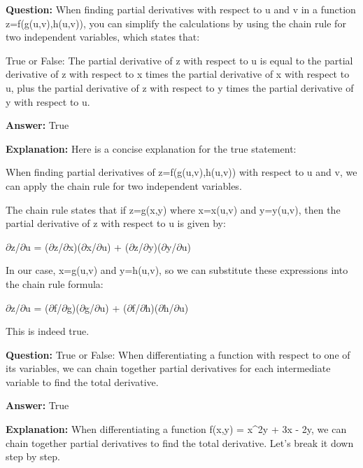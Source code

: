 \documentclass{article}
\begin{document}
                \vspace{0.5cm} 
        
            
                \textbf {Question:} When finding partial derivatives with respect to u and v in a function z=f(g(u,v),h(u,v)), you can simplify the calculations by using the chain rule for two independent variables, which states that:

True or False: The partial derivative of z with respect to u is equal to the partial derivative of z with respect to x times the partial derivative of x with respect to u, plus the partial derivative of z with respect to y times the partial derivative of y with respect to u.
                
                \textbf{Answer:} True

                \textbf{Explanation:} Here is a concise explanation for the true statement:

When finding partial derivatives of z=f(g(u,v),h(u,v)) with respect to u and v, we can apply the chain rule for two independent variables. 

The chain rule states that if z=g(x,y) where x=x(u,v) and y=y(u,v), then the partial derivative of z with respect to u is given by:

\ensuremath{\partial}z/\ensuremath{\partial}u = (\ensuremath{\partial}z/\ensuremath{\partial}x)(\ensuremath{\partial}x/\ensuremath{\partial}u) + (\ensuremath{\partial}z/\ensuremath{\partial}y)(\ensuremath{\partial}y/\ensuremath{\partial}u)

In our case, x=g(u,v) and y=h(u,v), so we can substitute these expressions into the chain rule formula:

\ensuremath{\partial}z/\ensuremath{\partial}u = (\ensuremath{\partial}f/\ensuremath{\partial}g)(\ensuremath{\partial}g/\ensuremath{\partial}u) + (\ensuremath{\partial}f/\ensuremath{\partial}h)(\ensuremath{\partial}h/\ensuremath{\partial}u)

This is indeed true.
                
                \vspace{0.5cm} 
        
            
                \textbf {Question:} True or False: When differentiating a function with respect to one of its variables, we can chain together partial derivatives for each intermediate variable to find the total derivative.
                
                \textbf{Answer:} True

                \textbf{Explanation:} When differentiating a function f(x,y) = x{\textasciicircum}2y + 3x - 2y, we can chain together partial derivatives to find the total derivative. Let's break it down step by step.
\end{document}
